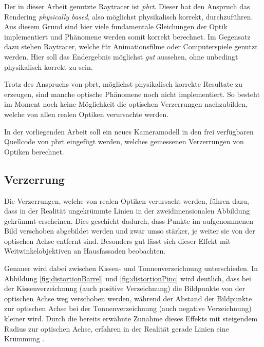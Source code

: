 Der in dieser Arbeit genutzte Raytracer ist \textit{pbrt}\cite{pbrt}. Dieser hat den Anspruch das Rendering \textit{physically based}, also möglichst physikalisch korrekt, durchzuführen. Aus diesem Grund sind hier viele fundamentale Gleichungen der Optik implementiert und Phänomene werden somit korrekt berechnet. Im Gegensatz dazu stehen Raytracer, welche für Animationsfilme oder Computerspiele genutzt werden. Hier soll das Endergebnis möglichst \textit{gut} aussehen, ohne unbedingt physikalisch korrekt zu sein. 

Trotz des Anspruchs von pbrt, möglichst physikalisch korrekte Resultate zu erzeugen, sind manche optische Phänomene noch nicht implementiert. So besteht im Moment noch keine Möglichkeit die optischen Verzerrungen nachzubilden, welche von allen realen Optiken verursachte werden.

In der vorliegenden Arbeit soll ein neues Kameramodell in den frei verfügbaren Quellcode von pbrt eingefügt werden, welches gemessenen Verzerrungen von Optiken berechnet.

\subsection{Verzerrung}

Die Verzerrungen, welche von realen Optiken verursacht werden, führen dazu, dass in der Realität ungekrümmte Linien in der zweidimensionalen Abbildung gekrümmt erscheinen. Dies geschieht dadurch, dass Punkte im aufgenommenen Bild verschoben abgebildet werden und zwar umso stärker, je weiter sie von der optischen Achse entfernt sind. Besonders gut lässt sich dieser Effekt mit Weitwinkelobjektiven an Hausfassaden beobachten. 

Genauer wird dabei zwischen Kissen- und Tonnenverzeichnung unterschieden. In Abbildung \ref{fig:distortionBarrel} und \ref{fig:distortionPinc} wird deutlich, dass bei der Kissenverzeichnung (auch positive Verzeichnung) die Bildpunkte von der optischen Achse weg verschoben werden, während der Abstand der Bildpunkte zur optischen Achse bei der Tonnenverzeichnung (auch negative Verzeichnung) kleiner wird. Durch die bereits erwähnte Zunahme dieses Effekts mit steigendem Radius zur optischen Achse, erfahren in der Realität gerade Linien eine Krümmung \cite{smith2000modern}.

